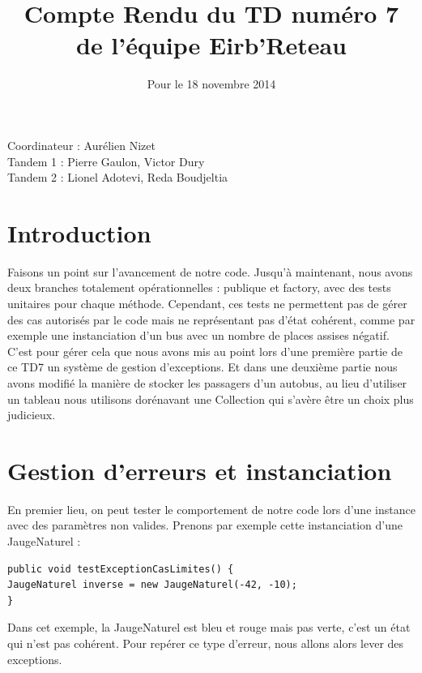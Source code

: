 \documentclass[a4paper,11pt]{article}
\begin{document}
\title{Compte Rendu du TD numéro 7 de l'équipe Eirb'Reteau}
\date{Pour le 18 novembre 2014}
\maketitle

\begin{center}
  Coordinateur : Aurélien Nizet \\
  Tandem 1 : Pierre Gaulon, Victor Dury \\
  Tandem 2 : Lionel Adotevi, Reda Boudjeltia  \\
\end{center}
\maketitle
\section{Introduction}
Faisons un point sur l'avancement de notre code. Jusqu'à maintenant, nous avons deux branches totalement opérationnelles : publique et factory, avec des tests unitaires pour chaque méthode. Cependant, ces tests ne permettent pas de gérer des cas autorisés par le code mais ne représentant pas d'état cohérent, comme par exemple une instanciation d'un bus avec un nombre de places assises négatif. C'est pour gérer cela que nous avons mis au point lors d'une première partie de ce TD7 un système de gestion d'exceptions. Et dans une deuxième partie nous avons modifié la manière de stocker les passagers d'un autobus, au lieu d'utiliser un tableau nous utilisons dorénavant une Collection qui s'avère être un choix plus judicieux.

\section{Gestion d’erreurs et instanciation}
En premier lieu, on peut tester le comportement de notre code lors d'une instance avec des paramètres non valides. Prenons par exemple cette instanciation d'une JaugeNaturel :
\begin{lstlisting}
public void testExceptionCasLimites() {
JaugeNaturel inverse = new JaugeNaturel(-42, -10); 
}
\end{lstlisting}
Dans cet exemple, la JaugeNaturel est bleu et rouge mais pas verte, c'est un état qui n'est pas cohérent. Pour repérer ce type d'erreur, nous allons alors lever des exceptions. \\
\end{document}
